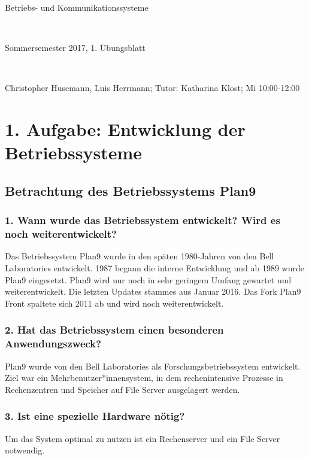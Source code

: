 \documentclass[numbers=noendperiod]{scrartcl}
\begin{document}
	
	
\hrulefill
\begin{center}
	\bfseries %
	\sffamily %
	\begin{huge}
		Betriebs- und Kommunikationssysteme
	\end{huge}\\
	\begin{Large}
		Sommersemester 2017, 1. Übungsblatt
	\end{Large}\\
	\begin{small}
		Christopher Husemann, Luis Herrmann; Tutor: Katharina Klost; Mi 10:00-12:00
	\end{small}
	
	\vspace{-10pt}
\end{center}
\hrulefill

\section*{1. Aufgabe: Entwicklung der Betriebssysteme}
\subsection*{Betrachtung des Betriebssystems Plan9}

\subsubsection*{1. Wann wurde das Betriebssystem entwickelt? Wird es noch weiterentwickelt?}
Das Betriebssystem Plan9 wurde in den späten 1980-Jahren von den Bell Laboratories entwickelt. 1987 begann die interne Entwicklung und ab 1989 wurde Plan9 eingesetzt. Plan9 wird nur noch in sehr geringem Umfang gewartet und weiterentwickelt. Die letzten Updates stammes aus Januar 2016. Das Fork Plan9 Front spaltete sich 2011 ab und wird noch weiterentwickelt.

\subsubsection*{2. Hat das Betriebssystem einen besonderen Anwendungszweck?}
Plan9 wurde von den Bell Laboratories als Forschungsbetriebssystem entwickelt. Ziel war ein Mehrbenutzer*innensystem, in dem rechenintensive Prozesse in Rechenzentren und Speicher auf File Server ausgelagert werden. 

\subsubsection*{3. Ist eine spezielle Hardware nötig?}
Um das System optimal zu nutzen ist ein Rechenserver und ein File Server notwendig.
\end{document}
